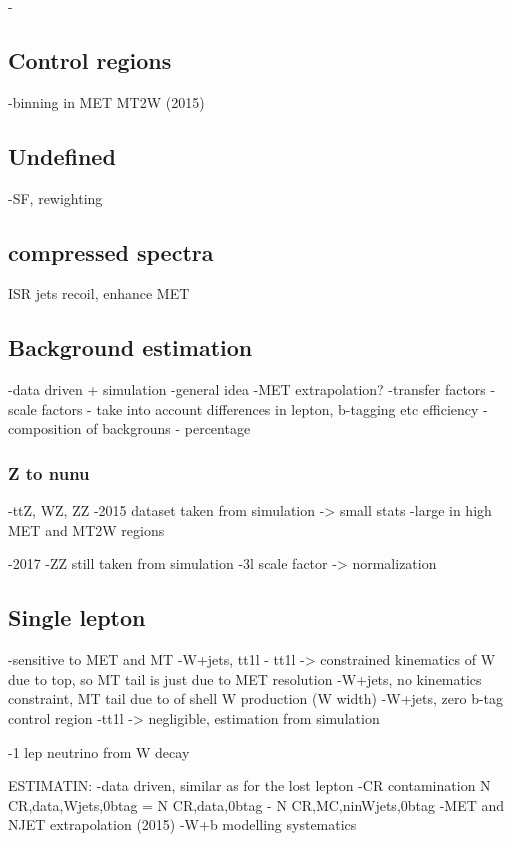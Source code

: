 -\subsection{Control regions}



-binning in
	MET
	MT2W (2015)
	

\subsection{Undefined}
-SF, rewighting

\subsection{compressed spectra}
	ISR jets
	recoil, enhance MET

\subsection{Background estimation}

-data driven + simulation
-general idea
-MET extrapolation?
-transfer factors
-scale factors - take into account differences in lepton, b-tagging etc efficiency
-composition of backgrouns - percentage

\subsubsection{Z to nunu}

-ttZ, WZ, ZZ
-2015 dataset taken from simulation -> small stats
-large in high MET and MT2W regions

-2017
-ZZ still taken from simulation
-3l scale factor -> normalization

\subsection{Single lepton}

-sensitive to MET and MT
-W+jets, tt1l
- tt1l -> constrained kinematics of W due to top, so MT tail is just due to MET resolution
-W+jets, no kinematics constraint, MT tail due to of shell W production (W width) 
-W+jets, zero b-tag control region
-tt1l -> negligible, estimation from simulation

-1 lep neutrino from W decay

ESTIMATIN:
-data driven, similar as for the lost lepton
-CR contamination N CR,data,Wjets,0btag = N CR,data,0btag - N CR,MC,ninWjets,0btag
-MET and NJET extrapolation (2015)
-W+b modelling systematics

